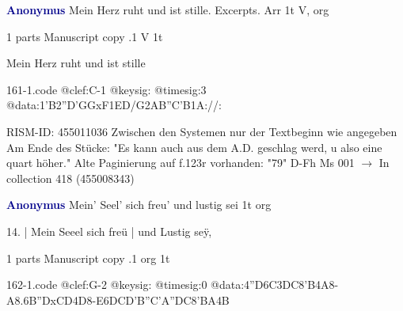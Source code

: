 \documentclass[twocolumn]{book}
\begin{document}
\newline \par \vspace{7pt} \textcolor{darkblue}{\textbf{Anonymus  }}
\newline Mein Herz ruht und ist stille. Excerpts. Arr  1t  
\newline V, org
\newline \begin{itshape}\end{itshape} 
\newline \textcolor{darkblue}{}  1 parts  
\newline Manuscript copy
.1  V  1t
\newline \begin{footnotesize} Mein Herz ruht und ist stille \end{footnotesize}  
\begin{filecontents*}{161-1.code}
@clef:C-1
@keysig:
@timesig:3
@data:1'B2''D'GGxF1ED/G2AB''C'B1A://:
\end{filecontents*}
\newline
%

\newline RISM-ID: 455011036
\newline Zwischen den Systemen nur der Textbeginn wie angegeben
\newline Am Ende des Stücke: "Es kann auch aus dem A.D. geschlag werd, u also eine quart höher."
\newline Alte Paginierung auf f.123r vorhanden: "79"
\newline D-Fh  Ms 001
\newline $\rightarrow$ In collection 418 (455008343)

\newline \par \vspace{7pt} \textcolor{darkblue}{\textbf{Anonymus  }}
\newline Mein' Seel' sich freu' und lustig sei  1t  
\newline org
\newline \begin{itshape}[f.9v, at left:] 14. | Mein Seeel sich freü | und Lustig seÿ,\end{itshape} 
\newline \textcolor{darkblue}{}  1 parts  
\newline Manuscript copy
.1  org  1t  
\begin{filecontents*}{162-1.code}
@clef:G-2
@keysig:
@timesig:0
@data:4''D{6C3DC8'B}4A8-A{8.6B''DxCD}4D8-E{6DCD'B}{''C'A''DC}{8'BA}4B
\end{filecontents*}
\newline
%
\end{document}
